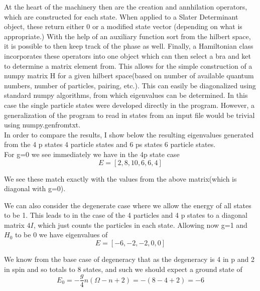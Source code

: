\documentclass[11pt]{article} %
\begin{document}
At the heart of the machinery then are the creation and annhilation operators, which are constructed for each state. When applied to a Slater Determinant object, these return either 0 or a modified state vector (depending on what is appropriate.) With the help of an auxiliary function sort from the hilbert space, it is possible to then keep track of the phase as well. Finally, a Hamiltonian class incorporates these operators into one object which can then select a bra and ket to determine a matrix element from. This allows for the simple construction of a numpy matrix H for a given hilbert space(based on number of available quantum numbers, number of particles, pairing, etc.). This can easily be diagonalized using standard numpy algorithms, from which eigenvalues can be determined. In this case the single particle states were developed directly in the program. However, a generalization of the program to read in states from an input file would be trivial using numpy.genfromtxt.\\

In order to compare the results, I show below the resulting eigenvalues generated from the 4 p states 4 particle states and 6 ps states 6 particle states.\\

For g=0 we see immediately we have in the 4p state case\\
\begin{equation}
E=\left[2,8,10,6,6,4\right] \end{equation}

We see these match exactly with the values from the above matrix(which is diagonal with g=0). 

We can also consider the degenerate case where we allow the energy of all states to be 1. This leads to in the case of the 4 particles and 4 p states to a diagonal matrix $4I$, which just counts the particles in each state. Allowing now g=1 and $H_0$ to be 0 we have eigenvalues of \\
\begin{equation}
E=\left[-6,-2,-2,0,0\right]\end{equation}

We know from the base case of degeneracy that as the degeneracy is 4 in p and 2 in spin and so totals to 8 states, and such we should expect a ground state of \\
\begin{equation}
E_0=-\frac{g}{4}n\left(\Omega-n+2\right)=-\left(8-4+2\right)=-6\end{equation}
\end{document}
